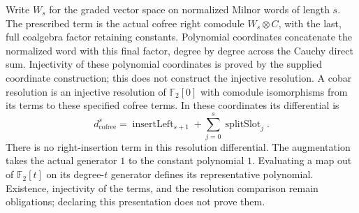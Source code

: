 \begin{definition}
  \label{def:milnor-cofree-resolution}
  \notready
  Write $W_s$ for the graded vector space on normalized Milnor words of
  length $s$. The prescribed term is the actual cofree right comodule
  $W_s\otimes C$, with the last, full coalgebra factor retaining constants.
  Polynomial coordinates concatenate the normalized word with this final
  factor, degree by degree across the Cauchy direct sum.
  Injectivity of these polynomial coordinates is proved by the supplied
  coordinate construction; this does not construct the injective resolution.
  A cobar resolution is an injective resolution of $\mathbb F_2[0]$ with
  comodule isomorphisms from its terms to these specified cofree terms.
  In these coordinates its differential is
  \[
    d_{\mathrm{cofree}}^s=\operatorname{insertLeft}_{s+1}
       +\sum_{j=0}^{s}\operatorname{splitSlot}_j.
  \]
  There is no right-insertion term in this resolution differential.
  The augmentation takes the actual generator $1$ to the constant
  polynomial $1$. Evaluating a map out of $\mathbb F_2[t]$ on its
  degree-$t$ generator defines its representative polynomial.
  Existence, injectivity of the terms, and the resolution comparison
  remain obligations; declaring this presentation does not prove them.
\end{definition}

